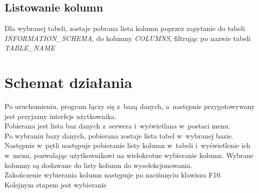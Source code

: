 \documentclass[a4paper,12pt]{article}
\begin{document}
\subsection{Listowanie kolumn}
Dla wybranej tabeli, zostaje pobrana lista kolumn poprzez zapytanie do tabeli \textit{INFORMATION\_SCHEMA}, do kolumny \textit{COLUMNS}, filtrując po nazwie tabeli \textit{TABLE\_NAME}
\section{Schemat działania}
Po uruchomieniu, program łączy się z~bazą danych, a~następnie przygotowywany jest przyjazny interfejs użytkownika.\\
Pobierana jest lista baz danych z~serwera i~wyświetlana w~postaci menu.\\
Po wybraniu bazy danych, pobierana zostaje lista tabel w~wybranej bazie.\\

Następnie w~pętli następuje pobieranie listy kolumn w~tabeli i~wyświetlenie ich w~menu, pozwalając użytkownikowi na wielokrotne wybieranie kolumn.
Wybrane kolumny są dodawane do listy kolumn do wyselekcjonowania.\\
Zakończenie wybierania kolumn następuje po naciśnięciu klawisza F10.\\

Kolejnym etapem jest wybieranie 
\end{document}
